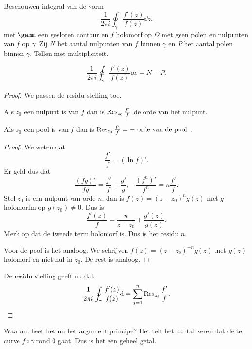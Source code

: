 Beschouwen integral van de vorm 
\[
	\frac{1}{2 \pi i} \oint_{\gamma} \frac{f'(z)}{f(z)} \dd z
.\] 
met $\gamm$ een gesloten contour en $f$ holomorf op $\Omega$ met geen polen en nulpunten van $f$ op $\gamma$. 
Zij $N$ het aantal nulpunten van $f$ binnen $\gamma$ en $P $ het aantal polen binnen $\gamma$. Tellen met multipliciteit.
\begin{stelling}
	[argumentprincipe]
\[
	\frac{1}{2 \pi i} \oint_{\gamma} \frac{f'(z)}{f(z)} \dd z = N - P
.\] 	
\end{stelling}
\begin{proof}
	We passen de residu stelling toe. 
	\begin{lemma}
		Als $z_0$ een nulpunt is van $f$ dan is $\operatorname{Res}_{z_0} \frac{f'}{f}$ de orde van het nulpunt.

		Als $z_0$ een pool is van $f$ dan is $\operatorname{Res}_{z_0} \frac{f'}{f} = - \text{ orde van de pool }$.
	\end{lemma}
	\begin{proof}
		We weten dat \[
			\frac{f'}{f} = \left( \ln f \right) '
		.\] 	
		Er geld dus dat \[
			\frac{\left( fg \right) '}{fg } = \frac{f'}{f} + \frac{g'}{g}, \;\;\; \frac{(f^{n})'}{f^{n}} =  n \frac{f'}{f}
		.\] 
		Stel $z_0$ is een nulpunt van  orde $n$, dan is $f(z) = (z - z_0)^{n}g(z)$ met $g$ holomorfm op $g(z_0) \ne 0$. 
		Dus is \[
			\frac{f'(z)}{f} = \frac{n}{z-z_0} + \frac{g'(z)}{g(z)}
		.\] 
		Merk op dat de tweede term holomorf is. Dus is het residu $n$. 


		Voor de pool is het analoog. 
		We schrijven $f(z) = (z - z_0)^{-n}g(z)$ met $g(z)$ holomorf en niet nul in $z_0$. De rest is analoog.
	\end{proof}

	De residu stelling geeft nu dat 
	\[
		\frac{1}{2 \pi i }\oint _{\gamma} \frac{f'(z)}{f(z)} \mathrm{d}  = \sum_{j = 1}^{n} \operatorname{Res}_{z_i} \frac{f'}{f}
	.\] 
\end{proof}
Waarom heet het nu het argument principe?
 Het telt het aantal keren dat de te curve $f\circ \gamma$ rond 0 gaat. Dus is het een geheel getal. 

